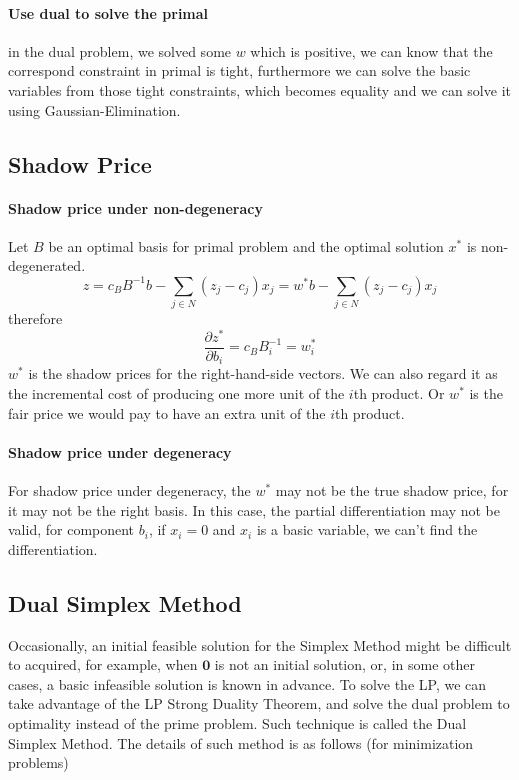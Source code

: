                 \paragraph{Use dual to solve the primal}
                    in the dual problem, we solved some $w$ which is positive, we can know that the correspond constraint in primal is tight, furthermore we can solve the basic variables from those tight constraints, which becomes equality and we can solve it using Gaussian-Elimination.

            \subsection{Shadow Price}
                \paragraph{Shadow price under non-degeneracy}
                    Let $B$ be an optimal basis for primal problem and the optimal solution $x^*$ is non-degenerated.
                    \begin{equation}
                        z=c_BB^{-1}b - \sum_{j\in N}(z_j - c_j)x_j = w^*b - \sum_{j\in N}(z_j - c_j)x_j \nonumber
                    \end{equation}
                    therefore
                    \begin{equation}
                        \frac{\partial z^*}{\partial b_i} = c_BB^{-1}_i = w_i^* \nonumber
                    \end{equation}
                    $w^*$ is the shadow prices for the right-hand-side vectors. We can also regard it as the incremental cost of producing one more unit of the $i$th product. Or $w^*$ is the fair price we would pay to have an extra unit of the $i$th product.

                \paragraph{Shadow price under degeneracy}
                    For shadow price under degeneracy, the $w^*$ may not be the true shadow price, for it may not be the right basis. In this case, the partial differentiation may not be valid, for component $b_i$, if $x_i = 0$ and $x_i$ is a basic variable, we can't find the differentiation.

            \subsection{Dual Simplex Method}
                Occasionally, an initial feasible solution for the Simplex Method might be difficult to acquired, for example, when $\mathbf{0}$ is not an initial solution, or, in some other cases, a basic infeasible solution is known in advance. To solve the LP, we can take advantage of the LP Strong Duality Theorem, and solve the dual problem to optimality instead of the prime problem. Such technique is called the Dual Simplex Method. The details of such method is as follows (for minimization problems)

